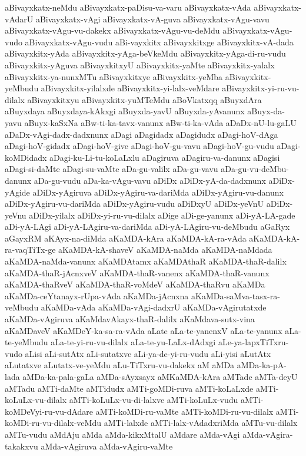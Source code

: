 {aBivayxkatx-neMdu
aBivayxkatx-paDisu-va-varu
aBivayxkatx-vAda
aBivayxkatx-vAdarU
aBivayxkatx-vAgi
aBivayxkatx-vA-guva
aBivayxkatx-vAgu-vavu
aBivayxkatx-vAgu-vu-dakekx
aBivayxkatx-vAgu-vu-deMdu
aBivayxkatx-vAgu-vudo
aBivayxkatx-vAgu-vudu
aBi-vayxkitx
aBivayxkitxge
aBivayxkitx-vA-dada
aBivayxkitx-yAda
aBivayxkitx-yAga-beVkeMdu
aBivayxkitx-yAga-di-ru-vudu
aBivayxkitx-yAguva
aBivayxkitxyU
aBivayxkitx-yaMte
aBivayxkitx-yalalx
aBivayxkitx-ya-nunxMTu
aBivayxkitxye
aBivayxkitx-yeMba
aBivayxkitx-yeMbudu
aBivayxkitx-yilalxde
aBivayxkitx-yi-lalx-veMdare
aBivayxkitx-yi-ru-vu-dilalx
aBivayxkitxyu
aBivayxkitx-yuMTeMdu
aBoVkatxqq
aBuyxdAra
aBuyxdaya
aBuyxdaya-kAkxgi
aBuyxda-yavU
aBuyxda-yAvanunx
aBuyx-da-yavu
aBuyx-kaSxNa
aBw-ti-ka-tavx-vanunx
aBw-ti-ka-vAda
aDaDx-nU-lu-gaLU
aDaDx-vAgi-dadx-dadxnunx
aDagi
aDagidadx
aDagidudx
aDagi-hoV-dAga
aDagi-hoV-gidadx
aDagi-hoV-give
aDagi-hoV-gu-vavu
aDagi-hoV-gu-vudu
aDagi-koMDidadx
aDagi-ku-Li-tu-koLaLxlu
aDagiruva
aDagiru-va-danunx
aDagisi
aDagi-si-daMte
aDagi-su-vaMte
aDa-gu-valilx
aDa-gu-vavu
aDa-gu-vu-deMbu-danunx
aDa-gu-vudu
aDa-ka-vAgu-vavu
aDiDx
aDiDx-yA-da-dadxnunx
aDiDx-yAgide
aDiDx-yAgiruva
aDiDx-yAgiru-va-dariMda
aDiDx-yAgiru-vu-danunx
aDiDx-yAgiru-vu-dariMda
aDiDx-yAgiru-vudu
aDiDxyU
aDiDx-yeVnU
aDiDx-yeVnu
aDiDx-yilalx
aDiDx-yi-ru-vu-dilalx
aDige
aDi-ge-yanunx
aDi-yA-LA-gade
aDi-yA-LAgi
aDi-yA-LAgiru-va-dariMda
aDi-yA-LAgiru-vu-deMbudu
aGaRyx
aGayxRM
aKAyx-na-diMda
aKaMDA-kAra
aKaMDA-kA-ra-vAda
aKaMDA-kA-ra-vaqTiTx-ge
aKaMDA-kA-shaveV
aKaMDA-naMda
aKaMDA-naMdada
aKaMDA-naMda-vanunx
aKaMDAtamx
aKaMDAthaR
aKaMDA-thaR-dalilx
aKaMDA-thaR-jAcnxveV
aKaMDA-thaR-vanenx
aKaMDA-thaR-vanunx
aKaMDA-thaRveV
aKaMDA-thaR-voMdeV
aKaMDA-thaRvu
aKaMDa
aKaMDa-ceYtanayx-rUpa-vAda
aKaMDa-jAcnxna
aKaMDa-saMva-tasx-ra-veMbudu
aKaMDa-vAda
aKaMDa-vAgi-dadxrU
aKaMDa-vAgirutatxde
aKaMDa-vAgiruva
aKaMdavAkayx-thaR-dalilx
aKaMdava-sutx-vina
aKaMDaveV
aKaMDeY-ka-sa-ra-vAda
aLate
aLa-te-yanenxV
aLa-te-yanunx
aLa-te-yeMbudu
aLa-te-yi-ru-vu-dilalx
aLa-te-yu-LaLx-dAdxgi
aLe-ya-lapxTiTxru-vudo
aLisi
aLi-sutAtx
aLi-sutatxve
aLi-ya-de-yi-ru-vudu
aLi-yisi
aLutAtx
aLutatxve
aLutatx-ve-yeMdu
aLu-TiTxru-vu-dakekx
aM
aMDa
aMDa-ka-pA-lada
aMDa-ka-pala-gaLa
aMDa-sAyxsayx
aMKaMDA-kAra
aMTade
aMTa-deyU
aMTadu
aMTi-daMte
aMTidudx
aMTi-goMDi-ruva
aMTi-koLaLxde
aMTi-koLuLx-vu-dilalx
aMTi-koLuLx-vu-di-lalxve
aMTi-koLuLx-vudu
aMTi-koMDeVyi-ru-vu-dAdare
aMTi-koMDi-ru-vaMte
aMTi-koMDi-ru-vu-dilalx
aMTi-koMDi-ru-vu-dilalx-veMdu
aMTi-lalxde
aMTi-lalx-vAdadxriMda
aMTu-vu-dilalx
aMTu-vudu
aMdAju
aMda
aMda-kikxMtalU
aMdare
aMda-vAgi
aMda-vAgira-takakxvu
aMda-vAgiruva
aMda-vAgiru-vaMte
}
